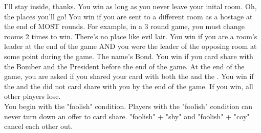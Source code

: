 \documentclass[a4paper, landscape]{article}
\begin{document}
\begin{center}
 {I'll stay inside, thanks.} {
	You win as long as you never leave your inital room.
}
 {Oh, the places you'll go!} {
	You win if you are sent to a different room as a hostage at the end of
	MOST rounds. For example, in a 3 round game, you must change rooms
	2 times to win.
}
 {There's no place like evil lair.} {
	You win if you are a room's leader at the end of the game AND you were
	the leader of the opposing room at some point during the game.
}
 {The name's Bond.} {
	You win if you card share with the Bomber and the President before the
	end of the game.
}
 {} {
	At the end of the game, you are asked if you shared your card with both
	the  and the . You win if the
	 and the  did not card share
	with you by the end of the game. If you win, all other players lose.
	\\\vspace{0.25cm}
	You begin with the "foolish" condition. Players with the "foolish"
	condition can never turn down an offer to card share. "foolish" + "shy"
	and "foolish" + "coy" cancel each other out.
}

\backpanel

\end{center}
\end{document}
